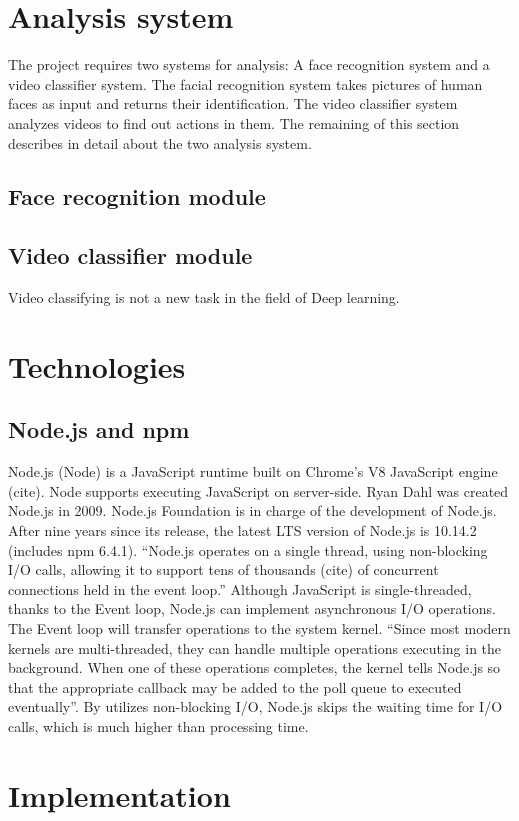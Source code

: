 \section{Analysis system}
The project requires two systems for analysis: A face recognition system and a video classifier system. The facial recognition system takes pictures of human faces as input and returns their identification. The video classifier system analyzes videos to find out actions in them. The remaining of this section describes in detail about the two analysis system.
\subsection{Face recognition module}
\subsection{Video classifier module}
Video classifying is not a new task in the field of Deep learning.
	
\section{Technologies}
\subsection{Node.js and npm}
Node.js (Node) is a JavaScript runtime built on Chrome's V8 JavaScript engine (cite). Node supports executing JavaScript on server-side. Ryan Dahl was created Node.js in 2009. Node.js Foundation is in charge of the development of Node.js. After nine years since its release, the latest LTS version of Node.js is 10.14.2 (includes npm 6.4.1). “Node.js operates on a single thread, using non-blocking I/O calls, allowing it to support tens of thousands (cite) of concurrent connections held in the event loop.” Although JavaScript is single-threaded, thanks to the Event loop, Node.js can implement asynchronous I/O operations. The Event loop will transfer operations to the system kernel. “Since most modern kernels are multi-threaded, they can handle multiple operations executing in the background. When one of these operations completes, the kernel tells Node.js so that the appropriate callback may be added to the poll queue to executed eventually”. By utilizes non-blocking I/O, Node.js skips the waiting time for I/O calls, which is much higher than processing time.
\section{Implementation}